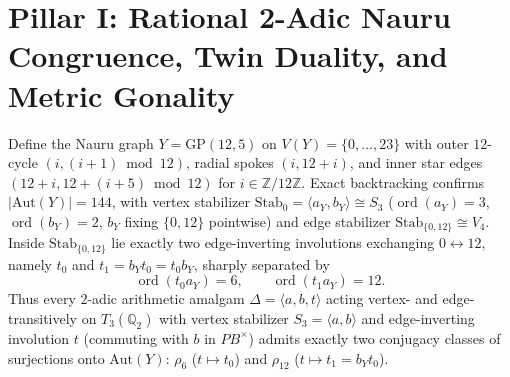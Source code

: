 \documentclass[11pt]{amsart}
\numberwithin{equation}{section}
\theoremstyle{plain}
\theoremstyle{definition}\newtheorem{definition}[theorem]{Definition}
\theoremstyle{remark}\newtheorem{remark}[theorem]{Remark}
\newcommand{\Q}{\mathbb{Q}}
\newcommand{\Z}{\mathbb{Z}}
\newcommand{\Aut}{\mathrm{Aut}}
\newcommand{\GP}{\mathrm{GP}}
\newcommand{\Stab}{\mathrm{Stab}}
\begin{document}
\section{Pillar I: Rational 2-Adic Nauru Congruence, Twin Duality, and Metric Gonality}\label{sec:pillar1}
Define the Nauru graph $Y = \GP(12,5)$ on $V(Y) = \{0,\dots,23\}$ with outer $12$-cycle $(i, (i+1)\bmod 12)$, radial spokes $(i, 12+i)$, and inner star edges $(12+i, 12+(i+5)\bmod 12)$ for $i\in\Z/12\Z$. Exact backtracking confirms $|\Aut(Y)| = 144$, with vertex stabilizer $\Stab_0 = \langle a_Y, b_Y\rangle \cong S_3$ ($\operatorname{ord}(a_Y)=3$, $\operatorname{ord}(b_Y)=2$, $b_Y$ fixing $\{0,12\}$ pointwise) and edge stabilizer $\Stab_{\{0,12\}} \cong V_4$. Inside $\Stab_{\{0,12\}}$ lie exactly two edge-inverting involutions exchanging $0 \leftrightarrow 12$, namely $t_0$ and $t_1 = b_Y t_0 = t_0 b_Y$, sharply separated by
\begin{equation}\label{eq:rho6_rho12}
\operatorname{ord}(t_0 a_Y) = 6, \qquad \operatorname{ord}(t_1 a_Y) = 12.
\end{equation}
Thus every $2$-adic arithmetic amalgam $\Delta = \langle a, b, t\rangle$ acting vertex- and edge-transitively on $T_3(\Q_2)$ with vertex stabilizer $S_3 = \langle a, b\rangle$ and edge-inverting involution $t$ (commuting with $b$ in $PB^\times$) admits exactly two conjugacy classes of surjections onto $\Aut(Y)$: $\rho_6$ ($t \mapsto t_0$) and $\rho_{12}$ ($t \mapsto t_1 = b_Y t_0$).
\end{document}
